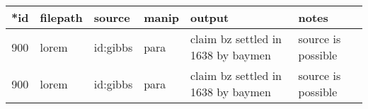 \begin{table}%
\caption{\lipsum[1][1]}%
\label{t:dummy}%
\begin{tabularx}{\textwidth}{clllXX}
\toprule
*id & filepath & source & manip & output & notes\\
\midrule
900 & lorem & id:gibbs & para & claim bz settled in 1638 by baymen & source is possible\\
\hline
900 & lorem & id:gibbs & para & claim bz settled in 1638 by baymen & source is possible\\
\bottomrule
\end{tabularx}
\end{table}